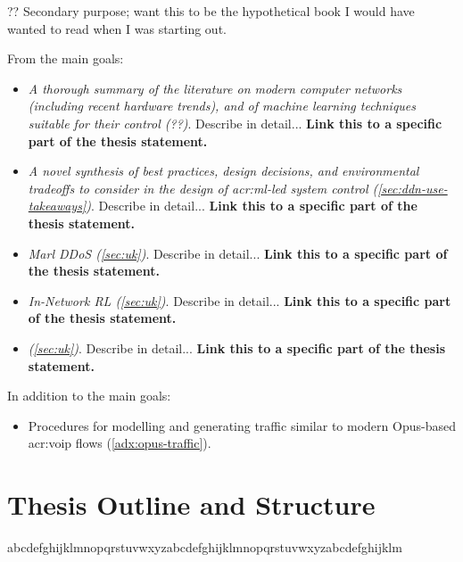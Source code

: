 ?? Secondary purpose; want this to be the hypothetical book I would have wanted to read when I was starting out.

From the main goals:
\begin{itemize}
	\item \emph{A thorough summary of the literature on modern computer networks (including recent hardware trends), and of machine learning techniques suitable for their control (??)}. Describe in detail... \textbf{Link this to a specific part of the thesis statement.}
	\item \emph{A novel synthesis of best practices, design decisions, and environmental tradeoffs to consider in the design of \gls{acr:ml}-led system control (\cref{sec:ddn-use-takeaways})}. Describe in detail... \textbf{Link this to a specific part of the thesis statement.}
	\item \emph{Marl DDoS (\cref{sec:uk})}. Describe in detail... \textbf{Link this to a specific part of the thesis statement.}
	\item \emph{In-Network RL (\cref{sec:uk})}. Describe in detail... \textbf{Link this to a specific part of the thesis statement.}
	\item \emph{\seidr{} (\cref{sec:uk})}. Describe in detail... \textbf{Link this to a specific part of the thesis statement.}
\end{itemize}

In addition to the main goals:
\begin{itemize}
	\item Procedures for modelling and generating traffic similar to modern Opus-based \gls{acr:voip} flows (\cref{adx:opus-traffic}).
\end{itemize}

\section{Thesis Outline and Structure}

abcdefghijklmnopqrstuvwxyzabcdefghijklmnopqrstuvwxyzabcdefghijklm